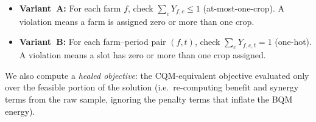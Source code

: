 \documentclass[11pt,a4paper]{article}
\begin{document}
\begin{itemize}
  \item \textbf{Variant~A:}  For each farm $f$, check
    $\sum_{c} Y_{f,c} \le 1$ (at-most-one-crop).
    A violation means a farm is assigned zero or more than one crop.
  \item \textbf{Variant~B:}  For each farm--period pair $(f, t)$, check
    $\sum_{c} Y_{f,c,t} = 1$ (one-hot).
    A violation means a slot has zero or more than one crop assigned.
\end{itemize}

We also compute a \emph{healed objective}: the CQM-equivalent objective evaluated
only over the feasible portion of the solution (i.e.\ re-computing benefit and
synergy terms from the raw sample, ignoring the penalty terms that inflate the
BQM energy).
\end{document}
